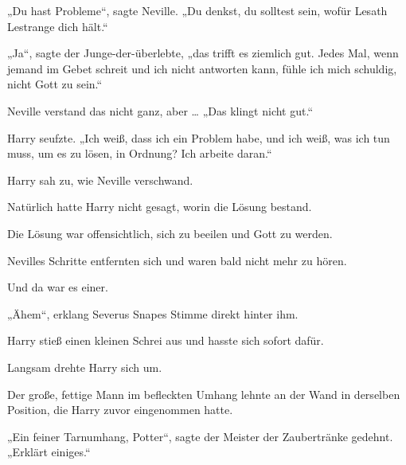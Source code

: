 „Du hast Probleme“, sagte Neville.
„Du denkst, du solltest sein, wofür Lesath Lestrange dich hält.“

„Ja“, sagte der Junge-der-überlebte, „das trifft es ziemlich gut. Jedes Mal, wenn jemand im Gebet schreit und ich nicht antworten kann, fühle ich mich schuldig, nicht Gott zu sein.“

Neville verstand das nicht ganz, aber …
„Das klingt nicht gut.“

Harry seufzte.
„Ich weiß, dass ich ein Problem habe, und ich weiß, was ich tun muss, um es zu lösen, in Ordnung? Ich arbeite daran.“

\later

Harry sah zu, wie Neville verschwand.

Natürlich hatte Harry nicht gesagt, worin die Lösung bestand.

Die Lösung war offensichtlich, sich zu beeilen und Gott zu werden.

Nevilles Schritte entfernten sich und waren bald nicht mehr zu hören.

Und da war es einer.

„Ähem“, erklang Severus Snapes Stimme direkt hinter ihm.

Harry stieß einen kleinen Schrei aus und hasste sich sofort dafür.

Langsam drehte Harry sich um.

Der große, fettige Mann im befleckten Umhang lehnte an der Wand in derselben Position, die Harry zuvor eingenommen hatte.

„Ein feiner Tarnumhang, Potter“, sagte der Meister der Zaubertränke gedehnt.
„Erklärt einiges.“

